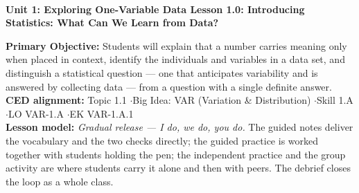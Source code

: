 \documentclass[10pt]{article}
\newcommand{\UnitNumberName}{Unit 1: Exploring One-Variable Data \quad}
\newcommand{\LessonNumberName}{Lesson 1.0: Introducing Statistics: What Can We Learn from Data?}
\begin{document}
\begin{center}
    {\Large\bfseries \CourseName \\
    {\small\bfseries \UnitNumberName \LessonNumberName}}
\end{center}

\begin{tcolorbox}[colback=sky, colframe=navy, boxrule=0.9pt, arc=2mm,
    left=2mm, right=2mm, top=1.5mm, bottom=1.5mm]
    \textbf{Primary Objective:} Students will explain that a number carries meaning only when
    placed in context, identify the individuals and variables in a data set, and distinguish a
    statistical question --- one that anticipates variability and is answered by collecting
    data --- from a question with a single definite answer.
    \\[2pt]
    \textbf{CED alignment:} Topic 1.1 \quad$\cdot$\quad Big Idea: VAR (Variation \& Distribution)
    \quad$\cdot$\quad Skill 1.A \quad$\cdot$\quad LO VAR-1.A \quad$\cdot$\quad EK VAR-1.A.1
    \\[2pt]
    \textbf{Lesson model:} \emph{Gradual release --- I do, we do, you do.} The guided notes
    deliver the vocabulary and the two checks directly; the guided practice is worked together
    with students holding the pen; the independent practice and the group activity are where
    students carry it alone and then with peers. The debrief closes the loop as a whole class.
\end{tcolorbox}
\end{document}
